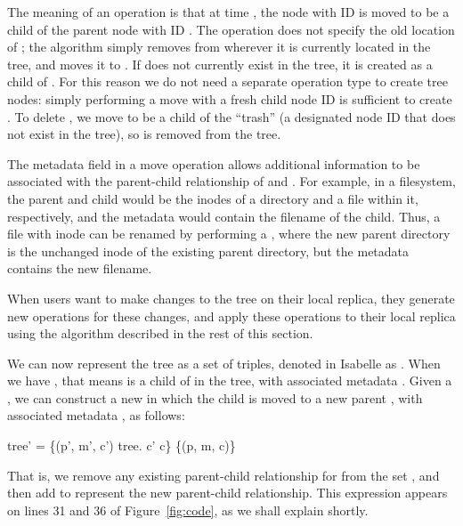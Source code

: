 \documentclass[sigplan,anonymous]{acmart}
\renewenvironment{isabelle}{%
  \medbreak\noindent%
  \renewcommand{\isanewline}{\\}%
  \begin{minipage}{\columnwidth}%
  \begin{isabellebody}%
  \begin{tabbing}%
}{%
  \end{tabbing}%
  \end{isabellebody}%
  \end{minipage}%
  \medbreak%
}
\begin{document}
The meaning of an operation  is that at time , the node with ID  is moved to be a child of the parent node with ID .
The operation does not specify the old location of ; the algorithm simply removes  from wherever it is currently located in the tree, and moves it to .
If  does not currently exist in the tree, it is created as a child of .
For this reason we do not need a separate operation type to create tree nodes: simply performing a move with a fresh child node ID  is sufficient to create .
To delete , we move  to be a child of the ``trash'' (a designated node ID that does not exist in the tree), so  is removed from the tree.

The metadata field  in a move operation allows additional information to be associated with the parent-child relationship of  and .
For example, in a filesystem, the parent and child would be the inodes of a directory and a file within it, respectively, and the metadata would contain the filename of the child.
Thus, a file with inode  can be renamed by performing a , where the new parent directory  is the unchanged inode of the existing parent directory, but the metadata  contains the new filename.

When users want to make changes to the tree on their local replica, they generate new  operations for these changes, and apply these operations to their local replica using the algorithm described in the rest of this section.

We can now represent the tree as a set of  triples, denoted in Isabelle as .
When we have , that means  is a child of  in the tree, with associated metadata .
Given a , we can construct a new  in which the child  is moved to a new parent , with associated metadata , as follows:
\begin{isabelle}
tree' = \{(p', m', c') {\isasymin} tree. c' {\isasymnoteq} c\} {\isasymunion} \{(p, m, c)\}
\end{isabelle}
That is, we remove any existing parent-child relationship for  from the set , and then add  to represent the new parent-child relationship.
This expression appears on lines 31 and 36 of Figure~\ref{fig:code}, as we shall explain shortly.
\end{document}
